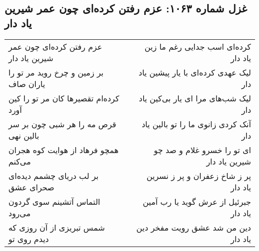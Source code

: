 \begin{center}
\section*{غزل شماره ۱۰۶۳: عزم رفتن کرده‌ای چون عمر شیرین یاد دار}
\label{sec:1063}
\begin{longtable}{l p{0.5cm} r}
عزم رفتن کرده‌ای چون عمر شیرین یاد دار
&&
کرده‌ای اسب جدایی رغم ما زین یاد دار
\\
بر زمین و چرخ روید مر تو را یاران صاف
&&
لیک عهدی کرده‌ای با یار پیشین یاد دار
\\
کرده‌ام تقصیرها کان مر تو را کین آورد
&&
لیک شب‌های مرا ای یار بی‌کین یاد دار
\\
قرص مه را هر شبی چون بر سر بالین نهی
&&
آنک کردی زانوی ما را تو بالین یاد دار
\\
همچو فرهاد از هوایت کوه هجران می‌کنم
&&
ای تو را خسرو غلام و صد چو شیرین یاد دار
\\
بر لب دریای چشمم دیده‌ای صحرای عشق
&&
پر ز شاخ زعفران و پر ز نسرین یاد دار
\\
التماس آتشینم سوی گردون می‌رود
&&
جبرئیل از عرش گوید یا رب آمین یاد دار
\\
شمس تبریزی از آن روزی که دیدم روی تو
&&
دین من شد عشق رویت مفخر دین یاد دار
\\
\end{longtable}
\end{center}
